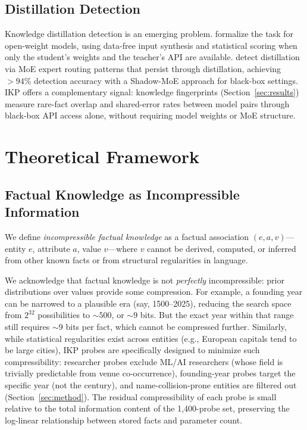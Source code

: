 \documentclass[11pt]{article}
\begin{document}
\subsection{Distillation Detection}

Knowledge distillation detection is an emerging problem. \citet{shi2025kddistillation} formalize the task for open-weight models, using data-free input synthesis and statistical scoring when only the student's weights and the teacher's API are available. \citet{li2025experts} detect distillation via MoE expert routing patterns that persist through distillation, achieving $>94\%$ detection accuracy with a Shadow-MoE approach for black-box settings. IKP offers a complementary signal: knowledge fingerprints (Section~\ref{sec:results}) measure rare-fact overlap and shared-error rates between model pairs through black-box API access alone, without requiring model weights or MoE structure.

\section{Theoretical Framework}
\label{sec:theory}

\subsection{Factual Knowledge as Incompressible Information}

We define \emph{incompressible factual knowledge} as a factual association $(e, a, v)$---entity $e$, attribute $a$, value $v$---where $v$ cannot be derived, computed, or inferred from other known facts or from structural regularities in language.

We acknowledge that factual knowledge is not \emph{perfectly} incompressible: prior distributions over values provide some compression. For example, a founding year can be narrowed to a plausible era (say, 1500--2025), reducing the search space from $2^{32}$ possibilities to ${\sim}500$, or ${\sim}9$ bits. But the exact year within that range still requires ${\sim}9$ bits per fact, which cannot be compressed further. Similarly, while statistical regularities exist across entities (e.g., European capitals tend to be large cities), IKP probes are specifically designed to minimize such compressibility: researcher probes exclude ML/AI researchers (whose field is trivially predictable from venue co-occurrence), founding-year probes target the specific year (not the century), and name-collision-prone entities are filtered out (Section~\ref{sec:method}). The residual compressibility of each probe is small relative to the total information content of the 1{,}400-probe set, preserving the log-linear relationship between stored facts and parameter count.
\end{document}
